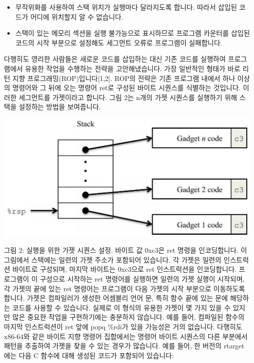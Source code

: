 \documentclass[10pt]{article}
\begin{document}
\begin{itemize}
\item 무작위화를 사용하여 스택 위치가 실행마다 달라지도록 합니다. 따라서 삽입된 코드가 어디에 위치할지 알 수 없습니다.
  \item 스택이 있는 메모리 섹션을 실행 불가능으로 표시하므로 프로그램 카운터를 삽입된 코드의 시작 부분으로 설정해도 세그먼트 오류로 프로그램이 실패합니다.
\end{itemize}
\noindent
다행히도 영리한 사람들은 새로운 코드를 삽입하는 대신 기존 코드를 실행하여 프로그램에서 유용한 작업을 수행하는 전략을 고안해냈습니다. 가장 일반적인 형태가 바로 리턴 지향 프로그래밍(ROP)입니다[1,2]. ROP의 전략은 기존 프로그램 내에서 하나 이상의 명령어와 그 뒤에 오는 명령어 ret로 구성된 바이트 시퀀스를 식별하는 것입니다. 이러한 세그먼트를 가젯이라고 합니다. 그림 2는 n개의 가젯 시퀀스를 실행하기 위해 스택을 설정하는 방법을 보여줍니다. 

\begin{center}
\includegraphics[max width=\textwidth]{attacklab_images/gadget.jpg}
\end{center}

그림 2: 실행을 위한 가젯 시퀀스 설정. 바이트 값 0xc3은 ret 명령을 인코딩합니다.
\noindent
이 그림에서 스택에는 일련의 가젯 주소가 포함되어 있습니다. 각 가젯은 일련의 인스트럭션 바이트로 구성되며, 마지막 바이트는 0xc3으로 ret 인스트럭션을 인코딩합니다. 프로그램이 이 구성으로 시작하는 ret 명령어를 실행하면 일련의 가젯 실행이 시작되며, 각 가젯의 끝에 있는 ret 명령어는 프로그램이 다음 가젯의 시작 부분으로 이동하도록 합니다.
\noindent
가젯은 컴파일러가 생성한 어셈블리 언어 문, 특히 함수 끝에 있는 문에 해당하는 코드를 사용할 수 있습니다. 실제로 이 형식의 유용한 가젯이 몇 가지 있을 수 있지만 많은 중요한 작업을 구현하기에는 충분하지 않습니다. 예를 들어, 컴파일된 함수의 마지막 인스트럭션이 ret 앞에 popq \%rdi가 있을 가능성은 거의 없습니다. 다행히도 x86-64와 같은 바이트 지향 명령어 집합에서는 명령어 바이트 시퀀스의 다른 부분에서 패턴을 추출하여 가젯을 찾을 수 있는 경우가 많습니다.
\noindent
예를 들어, 한 버전의 rtarget에는 다음 C 함수에 대해 생성된 코드가 포함되어 있습니다:
\end{document}
